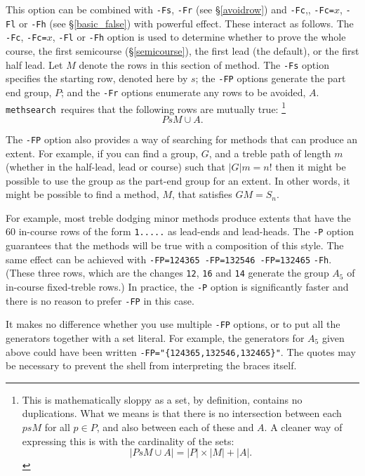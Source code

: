 \documentclass[a4paper,11pt,oneside]{book}
\makeatletter
\newcommand{\oi}[1]{\index{#1@{\hspace*{-\optwidth}\texttt{-}\texttt{#1}}}}
\def\methsearch{\texttt{meth\-search}}
\newcommand{\sref}[1]{\hyperref[#1]{\S\ref{#1}}}
\makeatother
\begin{document}
This option can be combined with \verb+-Fs+,\oi{Fs} \verb+-Fr+\oi{Fr} 
(see \sref{avoidrow}) and \verb+-Fc+,\oi{Fc}, \verb+-Fc=+$x$, 
\verb+-Fl+\oi{Fl} or \verb+-Fh+\oi{Fh} (see \sref{basic_false}) 
with powerful effect.  These interact as follows.
The \verb+-Fc+, \verb+-Fc=+$x$, \verb+-Fl+ or \verb+-Fh+ option is used to 
determine whether to prove the whole course, the first semicourse 
(\sref{semicourse}), the first lead (the default), or the first half lead.  
Let $M$ denote the rows in this section of method.
The \verb+-Fs+ option specifies the starting row, denoted here by $s$;
the \verb+-FP+ options generate the part end group, $P$; and 
the \verb+-Fr+ options enumerate any rows to be avoided, $A$.
\methsearch\ requires that the following rows are mutually true:%
\footnote{This is mathematically sloppy as a set, by definition,
contains no duplications.  What we means is that there is no intersection
between each $psM$ for all $p \in P$, and also between each of these and $A$.
A cleaner way of expressing this is with the cardinality%
 of the sets: 
\[ \left| P s M \cup A \right| 
 = \left|P\right| \times \left|M\right| + \left|A\right|. \]
} %
\[ PsM \cup A. \]

The \verb+-FP+ option also provides a way of searching for methods that
can produce an extent.
For example, if you can find a group, $G$, and a treble path of length $m$ 
(whether in the half-lead, lead or course) such that $\left|G\right|m = n!$
then it might be possible to use the group as the part-end group for an extent.
In other words, it might be possible to find a method, $M$, that satisfies
$GM=S_n$.  

For example, most treble dodging minor methods produce extents
that have the {60} in-course rows of the form \verb+1.....+ as lead-ends
and lead-heads.  The \verb+-P+ option guarantees that the methods will be
true with a composition of this style.  The same effect can be 
achieved with \verb+-FP=124365 -FP=132546 -FP=132465+ \verb+-Fh+.  
(These three rows, which are the changes \verb+12+, \verb+16+ and \verb+14+ 
generate the group $A_5$ of in-course fixed-treble rows.)  
In practice, the \verb+-P+ option is significantly faster and there is no 
reason to prefer \verb+-FP+ in this case.\oi{P}

It makes no difference whether you use multiple \verb+-FP+ options, or to put 
all the generators together with a set literal.  For example, the generators
for $A_5$ given above could have been written 
\verb+-FP="{124365,132546,132465}"+.  The quotes may be necessary to prevent
the shell from interpreting the braces itself.
\end{document}
